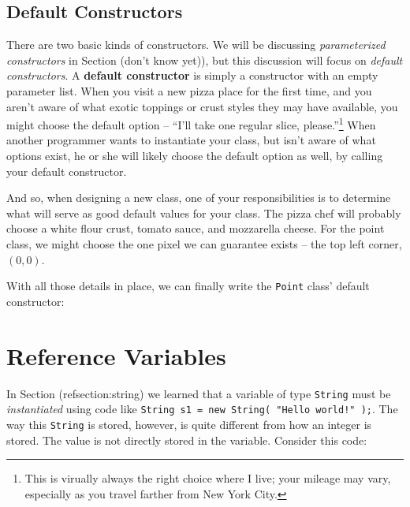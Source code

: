 \subsection{Default Constructors}

There are two basic kinds of constructors.  We will be discussing \textit{parameterized constructors} in Section (don't know yet)), but this discussion will focus on \textit{default constructors}.  A \textbf{default constructor} is simply a constructor with an empty parameter list.  When you visit a new pizza place for the first time, and you aren't aware of what exotic toppings or crust styles they may have available, you might choose the default option -- ``I'll take one regular slice, please.''\footnote{This is virually always the right choice where I live; your mileage may vary, especially as you travel farther from New York City.}  When another programmer wants to instantiate your class, but isn't aware of what options exist, he or she will likely choose the default option as well, by calling your default constructor.

And so, when designing a new class, one of your responsibilities is to determine what will serve as good default values for your class.  The pizza chef will probably choose a white flour crust, tomato sauce, and mozzarella cheese.  For the point class, we might choose the one pixel we can guarantee exists -- the top left corner, $(0,0)$.

With all those details in place, we can finally write the \texttt{Point} class' default constructor:
%
%


\section{Reference Variables}
\label{section:reference-variables}

In Section (ref{section:string}) we learned that a variable of type \texttt{String} must be \textit{instantiated} using code like \texttt{String s1 = new String( "Hello world!" );}.  The way this \texttt{String} is stored, however, is quite different from how an integer is stored.  The value is not directly stored in the variable.  Consider this code:
%

